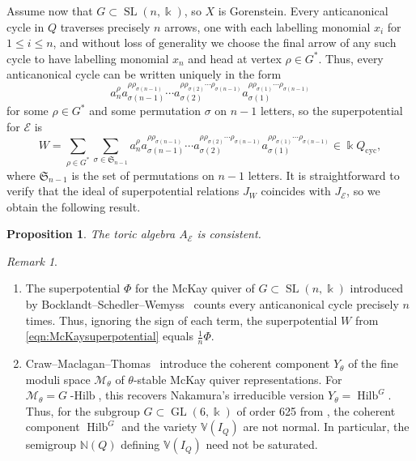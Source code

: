 \documentclass[11pt,a4paper]{amsart}
\numberwithin{equation}{section}
\newtheorem{proposition}[theorem]{Proposition}
\theoremstyle{definition}
\theoremstyle{remark}
\newtheorem{remark}[theorem]{Remark}
\newcommand{\kk}{\ensuremath{\Bbbk}}
\newcommand{\NN}{\ensuremath{\mathbb{N}}}
\newcommand{\ghilb}{\ensuremath{G}\operatorname{-Hilb}}
\newcommand{\hilbg}{\operatorname{Hilb}^{\ensuremath{G}}}
\newcommand{\GL}{\operatorname{GL}}
\newcommand{\SL}{\operatorname{SL}}
\begin{document}
Assume now that $G \subset \SL(n,\Bbbk)$, so $X$ is Gorenstein. Every anticanonical cycle in $Q$ traverses precisely $n$ arrows, one with each labelling monomial $x_i$ for $1\leq i\leq n$, and without loss of generality we choose the final arrow of any such cycle to have labelling monomial $x_n$ and head at vertex $\rho\in G^*$. Thus, every anticanonical cycle can be written uniquely in the form
\[
a_{n}^{\rho}a_{\sigma(n-1)}^{\rho\rho_{\sigma(n-1)}}\cdots   a_{\sigma(2)}^{\rho\rho_{\sigma(2)}\cdots \rho_{\sigma(n-1)}}a_{\sigma(1)}^{\rho\rho_{\sigma(1)}\cdots \rho_{\sigma(n-1)}} 
\]
for some $\rho\in G^*$ and some permutation $\sigma$ on $n-1$ letters, so the superpotential for $\mathscr{E}$ is
\begin{equation}
\label{eqn:McKaysuperpotential}
W=\sum_{\rho \in G^*}\sum_{\sigma \in \mathfrak{S}_{n-1}} a_{n}^{\rho}a_{\sigma(n-1)}^{\rho\rho_{\sigma(n-1)}}\cdots   a_{\sigma(2)}^{\rho\rho_{\sigma(2)}\cdots \rho_{\sigma(n-1)}}a_{\sigma(1)}^{\rho\rho_{\sigma(1)}\cdots \rho_{\sigma(n-1)}}  \in \kk Q_{\mathrm{cyc}},
\end{equation}
where $\mathfrak{S}_{n-1}$ is the set of permutations on $n-1$ letters.  It is straightforward to verify that the ideal of superpotential relations $J_W$ coincides with $J_{\mathscr{E}}$, so we obtain the following result.

\begin{proposition}
The toric algebra $A_{\mathscr{E}}$ is consistent.
\end{proposition}

\begin{remark}
\label{rem:notsaturated}
\begin{enumerate}
\item The superpotential $\Phi$ for the McKay quiver of $G \subset \SL(n,\Bbbk)$ introduced by Bocklandt--Schedler--Wemyss~\cite[\S4]{BSW} counts every anticanonical cycle precisely $n$ times. Thus, ignoring the sign of each term, the superpotential $W$ from \eqref{eqn:McKaysuperpotential} equals $\frac{1}{n}\Phi$.
\item Craw--Maclagan--Thomas~\cite{CMT1} introduce the coherent component $Y_{\theta}$ of the fine moduli space $\mathcal{M}_{\theta}$ of $\theta$-stable McKay quiver representations. For $\mathcal{M}_{\theta} = \ghilb$, this recovers Nakamura's irreducible version  $Y_{\theta}=\hilbg$. Thus, for the subgroup $G\subset \GL(6,\kk)$ of order 625 from \cite[Example~5.7]{CMT2}, the coherent component $\hilbg$ and the variety $\mathbb{V}(I_Q)$ are not normal. In particular, the semigroup $\NN(Q)$ defining $\mathbb{V}(I_Q)$ need not be saturated.
\end{enumerate}
\end{remark}
\end{document}
